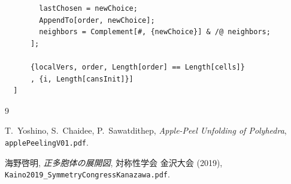 \documentclass[12pt,a4paper]{article}
\theoremstyle{definition}
\begin{document}
\begin{lstlisting}
        lastChosen = newChoice;
        AppendTo[order, newChoice];
        neighbors = Complement[#, {newChoice}] & /@ neighbors;
      ];

      {localVers, order, Length[order] == Length[cells]}
      , {i, Length[cansInit]}]
  ]
\end{lstlisting}

\begin{thebibliography}{9}

  T.~Yoshino, S.~Chaidee, P.~Sawatdithep,
  \textit{Apple-Peel Unfolding of Polyhedra},
  \texttt{applePeelingV01.pdf}.

  海野啓明,
  \textit{正多胞体の展開図},
  対称性学会 金沢大会 (2019), \texttt{Kaino2019\_SymmetryCongressKanazawa.pdf}.

\end{thebibliography}
\end{document}
